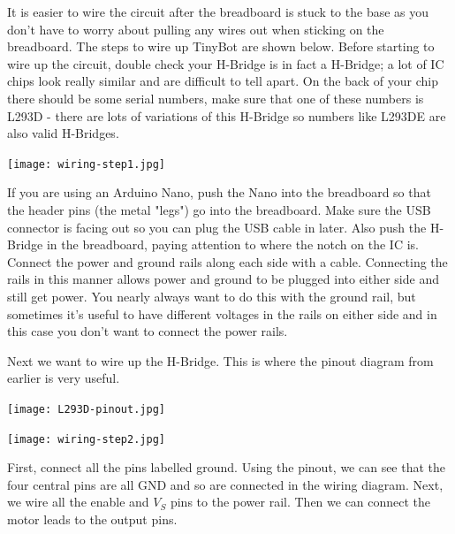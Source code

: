 \documentclass[../TinyBot.tex]{subfiles}
\begin{document}
\bigskip 
It is easier to wire the circuit after the breadboard is stuck to the base as you don't have to worry about pulling any wires out when sticking on the breadboard. The steps to wire up TinyBot are shown below. 
Before starting to wire up the circuit, double check your H-Bridge is in fact a H-Bridge; a lot of IC chips look really similar and are difficult to tell apart. On the back of your chip there should be some serial numbers, make sure that one of these numbers is L293D - there are lots of variations of this H-Bridge so numbers like L293DE are also valid H-Bridges. \\


\begin{center}
    \texttt{[image: wiring-step1.jpg]}
\end{center}

If you are using an Arduino Nano, push the Nano into the breadboard so that the header pins (the metal "legs") go into the breadboard. Make sure the USB connector is facing out so you can plug the USB cable in later. Also push the H-Bridge in the breadboard, paying attention to where the notch on the IC is. Connect the power and ground rails along each side with a cable. Connecting the rails in this manner allows power and ground to be plugged into either side and still get power. You nearly always want to do this with the ground rail, but sometimes it's useful to have different voltages in the rails on either side and in this case you don't want to connect the power rails. \\
\pagebreak

Next we want to wire up the H-Bridge. This is where the pinout diagram from earlier is very useful. 

\begin{minipage}[t]{0.25\textwidth}\vspace{0pt}
        \texttt{[image: L293D-pinout.jpg]}
\end{minipage} \hfill
\begin{minipage}[t]{0.77\textwidth} \vspace{0pt}
    \texttt{[image: wiring-step2.jpg]}
\end{minipage}
\bigskip

First, connect all the pins labelled ground. Using the pinout, we can see that the four central pins are all GND and so are connected in the wiring diagram. Next, we wire all the enable and $V_S$ pins to the power rail. Then we can connect the motor leads to the output pins. \\
\end{document}
